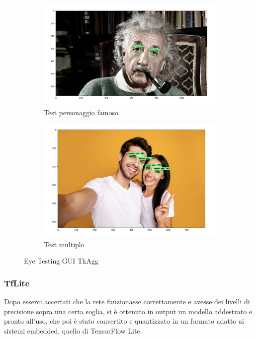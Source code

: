 \documentclass[11pt]{article}
\begin{document}
\begin{figure}
\begin{subfigure}{0.5\textwidth}
  \centering
  \includegraphics[width=1\linewidth]{img/einstein.png}
  \caption{Test personaggio famoso}
  \label{fig:sfig1}
\end{subfigure}%
\begin{subfigure}{0.5\textwidth}
  \centering
  \includegraphics[width=1\linewidth]{img/gruppo.png}
  \caption{Test multiplo}
  \label{fig:sfig2}
\end{subfigure}
\caption{Eye Testing GUI TkAgg}
\label{fig:fig}
\end{figure}


\subsubsection{TfLite}
Dopo esserci accertati che la rete funzionasse correttamente e avesse dei livelli di precisione sopra una certa soglia, si è ottenuto in output un modello addestrato
e pronto all’uso, che poi è stato convertito e quantizzato in un formato adatto ai sistemi embedded, quello di TensorFlow Lite.
\end{document}
